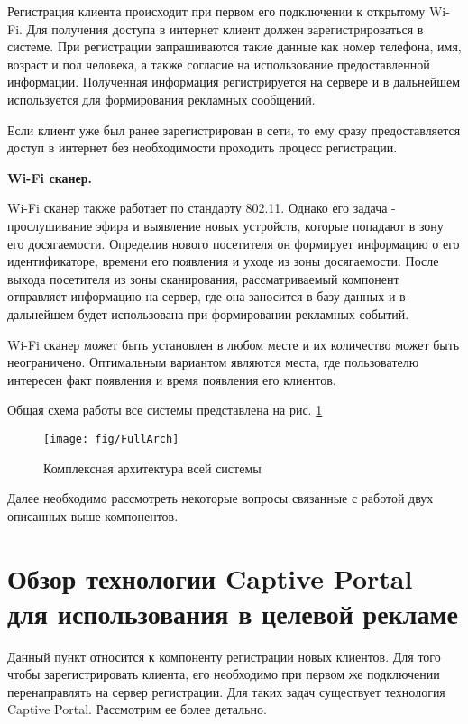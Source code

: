 Регистрация клиента происходит при первом его подключении к открытому Wi-Fi. Для получения доступа в интернет клиент должен зарегистрироваться в системе. При регистрации запрашиваются такие данные как номер телефона, имя, возраст и пол человека, а также согласие на использование предоставленной информации. Полученная информация регистрируется на сервере и в дальнейшем используется для формирования рекламных сообщений.

Если клиент уже был ранее зарегистрирован в сети, то ему сразу предоставляется доступ в интернет без необходимости проходить процесс регистрации.

\textbf{Wi-Fi сканер.}

Wi-Fi сканер также работает по стандарту 802.11. Однако его задача - прослушивание эфира и выявление новых устройств, которые попадают в зону его досягаемости. Определив нового посетителя он формирует информацию о его идентификаторе, времени его появления и уходе из зоны досягаемости. После выхода посетителя из зоны сканирования, рассматриваемый компонент отправляет информацию на сервер, где она заносится в базу данных и в дальнейшем будет использована при формировании рекламных событий.

Wi-Fi сканер может быть установлен в любом месте и их количество может быть неограничено. Оптимальным вариантом являются места, где пользователю интересен факт появления и время появления его клиентов.

Общая схема работы все системы представлена на рис. \ref{fig:FullArch}

\begin{figure}[H]
	\centering
	\texttt{[image: fig/FullArch]}
	\caption{Комплексная архитектура всей системы}
	\label{fig:FullArch}
\end{figure}


Далее необходимо рассмотреть некоторые вопросы связанные с работой двух описанных выше компонентов.

\section{Обзор технологии Captive Portal для использования в целевой рекламе}

Данный пункт относится к компоненту регистрации новых клиентов. Для того чтобы зарегистрировать клиента, его необходимо при первом же подключении перенаправлять на сервер регистрации. Для таких задач существует технология Captive Portal. Рассмотрим ее более детально.

